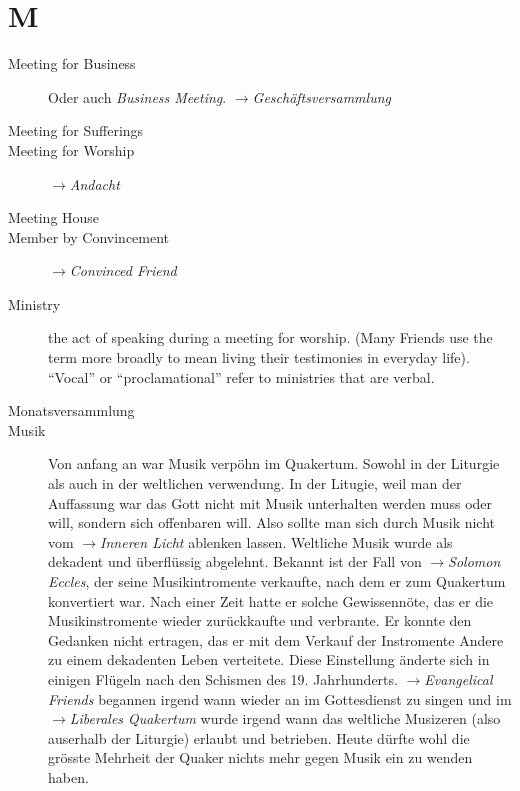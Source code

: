 \section*{M}

\articlesize

\begin{description}

 \item[Meeting for Business] Oder auch \textit{Business Meeting}.
 $\to$\textit{Geschäftsversammlung}

 \item[Meeting for Sufferings]
 
 \item[Meeting for Worship]  $\to$\textit{Andacht}

 \item[Meeting House]

 \item[Member by Convincement] $\to$\textit{Convinced Friend}
 
 \item[Ministry]
    the act of speaking during a meeting for worship. (Many Friends use the term more broadly to mean living their testimonies in everyday life). "`Vocal"' or "`proclamational"' refer to ministries that are verbal.
 
 \item[Monatsversammlung]
 
 \item[Musik] Von anfang an war Musik verpöhn im Quakertum. Sowohl in der Liturgie
 als auch in der weltlichen verwendung. In der Litugie, weil man der Auffassung war
 das Gott nicht mit Musik unterhalten werden muss oder will, sondern sich offenbaren
 will. Also sollte man sich durch Musik nicht vom $\to$\textit{Inneren Licht}
 ablenken lassen. Weltliche Musik wurde als dekadent und überflüssig abgelehnt.
 Bekannt ist der Fall von $\to$\textit{Solomon Eccles}, der seine Musikintromente
 verkaufte, nach dem er zum Quakertum konvertiert war. Nach einer Zeit hatte er
 solche Gewissennöte, das er die Musikinstromente wieder zurückkaufte und
 verbrante. Er konnte den Gedanken nicht ertragen, das er mit dem Verkauf der
 Instromente Andere zu einem dekadenten Leben verteitete. Diese Einstellung
 änderte sich in einigen Flügeln nach den Schismen des 19. Jahrhunderts.
 $\to$\textit{Evangelical Friends} begannen irgend wann wieder an im
 Gottesdienst zu singen und im $\to$\textit{Liberales Quakertum} wurde irgend
 wann das weltliche Musizeren (also auserhalb der Liturgie) erlaubt und
 betrieben. Heute dürfte wohl die grösste Mehrheit der Quaker nichts mehr
 gegen Musik ein zu wenden haben.

 \end{description}

\normalsize
